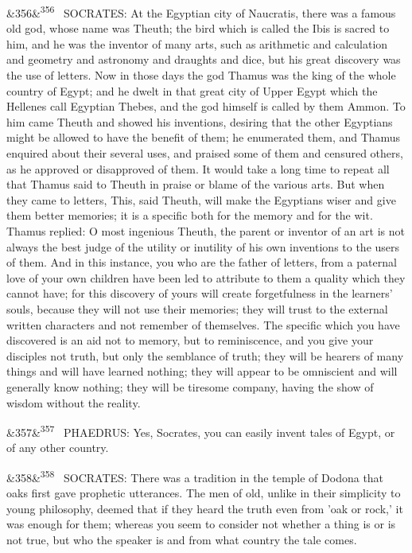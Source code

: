 \documentclass[12pt]{article}
\newcommand{\para}[1][]{\par\noindent\ifx&#1&\else\textsuperscript{\footnotesize #1}~\fi}
\begin{document}
\para[356] SOCRATES: At the Egyptian city of Naucratis, there was a famous old god, whose name was Theuth; the bird which is called the Ibis is sacred to him, and he was the inventor of many arts, such as arithmetic and calculation and geometry and astronomy and draughts and dice, but his great discovery was the use of letters. Now in those days the god Thamus was the king of the whole country of Egypt; and he dwelt in that great city of Upper Egypt which the Hellenes call Egyptian Thebes, and the god himself is called by them Ammon. To him came Theuth and showed his inventions, desiring that the other Egyptians might be allowed to have the benefit of them; he enumerated them, and Thamus enquired about their several uses, and praised some of them and censured others, as he approved or disapproved of them. It would take a long time to repeat all that Thamus said to Theuth in praise or blame of the various arts. But when they came to letters, This, said Theuth, will make the Egyptians wiser and give them better memories; it is a specific both for the memory and for the wit. Thamus replied: O most ingenious Theuth, the parent or inventor of an art is not always the best judge of the utility or inutility of his own inventions to the users of them. And in this instance, you who are the father of letters, from a paternal love of your own children have been led to attribute to them a quality which they cannot have; for this discovery of yours will create forgetfulness in the learners' souls, because they will not use their memories; they will trust to the external written characters and not remember of themselves. The specific which you have discovered is an aid not to memory, but to reminiscence, and you give your disciples not truth, but only the semblance of truth; they will be hearers of many things and will have learned nothing; they will appear to be omniscient and will generally know nothing; they will be tiresome company, having the show of wisdom without the reality.

\para[357] PHAEDRUS: Yes, Socrates, you can easily invent tales of Egypt, or of any other country.

\para[358] SOCRATES: There was a tradition in the temple of Dodona that oaks first gave prophetic utterances. The men of old, unlike in their simplicity to young philosophy, deemed that if they heard the truth even from 'oak or rock,' it was enough for them; whereas you seem to consider not whether a thing is or is not true, but who the speaker is and from what country the tale comes.
\end{document}
